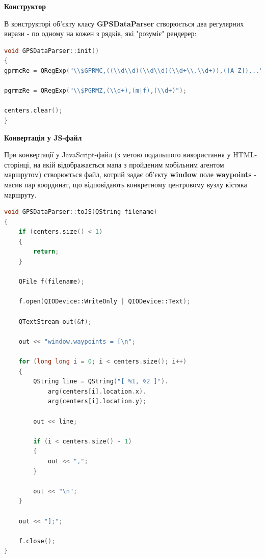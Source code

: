 \documentclass[simple,a4paper,14pt,ukrainian,utf8]{eskdtext}
\begin{document}
        \textbf{Конструктор}
        
        В конструкторі об’єкту класу \textbf{GPSDataParser} створюється два регулярних вирази - по одному на кожен з рядків, які "розуміє" рендерер:
        
\begin{small}
\begin{lstlisting}[language=C++]
void GPSDataParser::init()
{
gprmcRe = QRegExp("\\$GPRMC,((\\d\\d)(\\d\\d)(\\d+\\.\\d+)),([A-Z])...");

pgrmzRe = QRegExp("\\$PGRMZ,(\\d+),(m|f),(\\d+)");

centers.clear();
}
\end{lstlisting}
\end{small}
        
        \textbf{Конвертація у JS-файл}
        
        При конвертації у JavaScript-файл (з метою подальшого використання у HTML-сторінці, на якій відображається мапа з пройденим мобільним агентом маршрутом) створюється файл, котрий задає об’єкту \textbf{window} поле \textbf{waypoints} - масив пар координат, що відповідають конкретному центровому вузлу кістяка маршруту.

\begin{small}        
\begin{lstlisting}[language=C++]
void GPSDataParser::toJS(QString filename)
{
    if (centers.size() < 1)
    {
        return;
    }

    QFile f(filename);

    f.open(QIODevice::WriteOnly | QIODevice::Text);

    QTextStream out(&f);

    out << "window.waypoints = [\n";

    for (long long i = 0; i < centers.size(); i++)
    {
        QString line = QString("[ %1, %2 ]").
        	arg(centers[i].location.x).
        	arg(centers[i].location.y);

        out << line;

        if (i < centers.size() - 1)
        {
            out << ",";
        }

        out << "\n";
    }

    out << "];";

    f.close();
}
\end{lstlisting}
\end{small}
\end{document}
